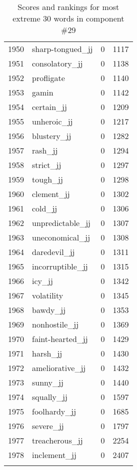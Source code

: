 \begin{longtable}[!htbp]{| rlr@{.}l |}
    1950 & sharp-tongued\_jj & 0 & 1117 \\
    1951 & consolatory\_jj & 0 & 1138 \\
    1952 & profligate & 0 & 1140 \\
    1953 & gamin & 0 & 1142 \\
    1954 & certain\_jj & 0 & 1209 \\
    1955 & unheroic\_jj & 0 & 1217 \\
    1956 & blustery\_jj & 0 & 1282 \\
    1957 & rash\_jj & 0 & 1294 \\
    1958 & strict\_jj & 0 & 1297 \\
    1959 & tough\_jj & 0 & 1298 \\
    1960 & clement\_jj & 0 & 1302 \\
    1961 & cold\_jj & 0 & 1306 \\
    1962 & unpredictable\_jj & 0 & 1307 \\
    1963 & uneconomical\_jj & 0 & 1308 \\
    1964 & daredevil\_jj & 0 & 1311 \\
    1965 & incorruptible\_jj & 0 & 1315 \\
    1966 & icy\_jj & 0 & 1342 \\
    1967 & volatility & 0 & 1345 \\
    1968 & bawdy\_jj & 0 & 1353 \\
    1969 & nonhostile\_jj & 0 & 1369 \\
    1970 & faint-hearted\_jj & 0 & 1429 \\
    1971 & harsh\_jj & 0 & 1430 \\
    1972 & ameliorative\_jj & 0 & 1432 \\
    1973 & sunny\_jj & 0 & 1440 \\
    1974 & squally\_jj & 0 & 1597 \\
    1975 & foolhardy\_jj & 0 & 1685 \\
    1976 & severe\_jj & 0 & 1797 \\
    1977 & treacherous\_jj & 0 & 2254 \\
    1978 & inclement\_jj & 0 & 2407 \\
    \hline
    \caption{Scores and rankings for most extreme 30 words in component \#29} \\
\end{longtable}
